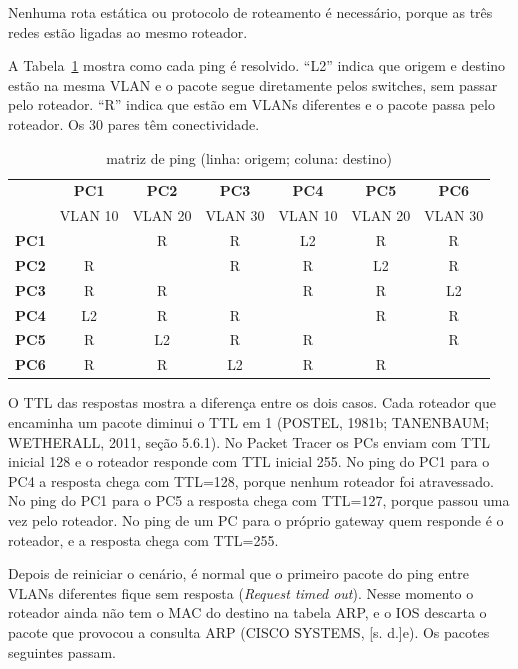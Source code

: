 Nenhuma rota estática ou protocolo de roteamento é necessário, porque as três redes estão ligadas ao mesmo roteador.


A Tabela~\ref{tab:ping} mostra como cada ping é resolvido. ``L2'' indica que origem e destino estão na mesma VLAN e o pacote segue diretamente pelos switches, sem passar pelo roteador. ``R'' indica que estão em VLANs diferentes e o pacote passa pelo roteador. Os 30 pares têm conectividade.

\begin{table}[H]
\caption{matriz de ping (linha: origem; coluna: destino)}\label{tab:ping}
\small\renewcommand{\arraystretch}{1.2}
\centering
\begin{tabular}{@{}lcccccc@{}}
\toprule
 & \textbf{PC1} & \textbf{PC2} & \textbf{PC3} & \textbf{PC4} & \textbf{PC5} & \textbf{PC6}\\
 & \scriptsize VLAN 10 & \scriptsize VLAN 20 & \scriptsize VLAN 30 & \scriptsize VLAN 10 & \scriptsize VLAN 20 & \scriptsize VLAN 30\\
\midrule
\textbf{PC1} & & R & R & L2 & R & R\\
\textbf{PC2} & R & & R & R & L2 & R\\
\textbf{PC3} & R & R & & R & R & L2\\
\textbf{PC4} & L2 & R & R & & R & R\\
\textbf{PC5} & R & L2 & R & R & & R\\
\textbf{PC6} & R & R & L2 & R & R & \\
\bottomrule
\end{tabular}
\fonte
\end{table}

O TTL das respostas mostra a diferença entre os dois casos. Cada roteador que encaminha um pacote diminui o TTL em 1 (POSTEL, 1981b; TANENBAUM; WETHERALL, 2011, seção 5.6.1). No Packet Tracer os PCs enviam com TTL inicial 128 e o roteador responde com TTL inicial 255. No ping do PC1 para o PC4 a resposta chega com TTL=128, porque nenhum roteador foi atravessado. No ping do PC1 para o PC5 a resposta chega com TTL=127, porque passou uma vez pelo roteador. No ping de um PC para o próprio gateway quem responde é o roteador, e a resposta chega com TTL=255.

Depois de reiniciar o cenário, é normal que o primeiro pacote do ping entre VLANs diferentes fique sem resposta (\emph{Request timed out}). Nesse momento o roteador ainda não tem o MAC do destino na tabela ARP, e o IOS descarta o pacote que provocou a consulta ARP (CISCO SYSTEMS, [s. d.]e). Os pacotes seguintes passam.

